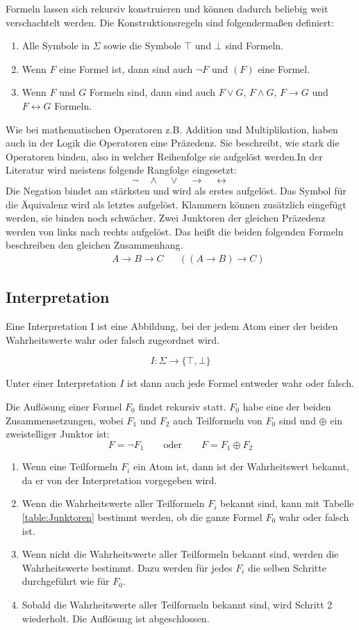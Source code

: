 Formeln lassen sich rekursiv konstruieren und können dadurch beliebig weit verschachtelt werden. Die Konstruktionsregeln sind folgendermaßen definiert:
\begin{enumerate}
	\item Alle Symbole in $\Sigma$ sowie die Symbole $\top$ und $\bot$ sind Formeln.
	\item Wenn $F$ eine Formel ist, dann sind auch $\neg F$ und $(F)$ eine Formel.
	\item Wenn $F$ und $G$ Formeln sind, dann sind auch $F \vee G$, $F \wedge G$, $F \to G$ und $F \leftrightarrow G$ Formeln.
\end{enumerate}
Wie bei mathematischen Operatoren z.B. Addition und Multiplikation, haben auch in der Logik die Operatoren eine Präzedenz. Sie beschreibt, wie stark die Operatoren binden, also in welcher Reihenfolge sie aufgelöst werden.In der Literatur wird meistens folgende Rangfolge eingesetzt:
$$\neg \quad \wedge \quad \vee \quad \to \quad \leftrightarrow$$
Die Negation bindet am stärksten und wird als erstes aufgelöst. Das Symbol für die Äquivalenz wird als letztes aufgelöst. Klammern können zusätzlich eingefügt werden, sie binden noch schwächer.
Zwei Junktoren der gleichen Präzedenz werden von links nach rechts aufgelöst. Das heißt die beiden folgenden Formeln beschreiben den gleichen Zusammenhang.
\begin{align*}
	&& A\to B\to C && ((A\to B)\to C)
\end{align*}
\subsection{Interpretation}

Eine Interpretation I ist eine Abbildung, bei der jedem Atom einer der beiden Wahrheitswerte wahr oder falsch zugeordnet wird. 

$$I: \Sigma\to\{\top,\bot\}$$

Unter einer Interpretation $I$ ist dann auch jede Formel entweder wahr oder falsch.

Die Auflösung einer Formel $F_0$ findet rekursiv statt. $F_0$ habe eine der beiden Zusammensetzungen, wobei $F_1$ und $F_2$ auch Teilformeln von $F_0$ sind und $\oplus$ ein zweistelliger Junktor ist:
$$F=\neg F_1 \quad\quad\text{oder}\quad\quad F=F_1 \oplus F_2$$ 
\begin{enumerate}
	\item Wenn eine Teilformeln $F_i$ ein Atom ist, dann ist der Wahrheitswert bekannt, da er von der Interpretation vorgegeben wird.
	\item Wenn die Wahrheitswerte aller Teilformeln $F_i$ bekannt sind, kann mit Tabelle \ref{table:Junktoren} bestimmt werden, ob die ganze Formel $F_0$ wahr oder falsch ist.
	\item Wenn nicht die Wahrheitswerte aller Teilformeln bekannt sind, werden die Wahrheitswerte bestimmt. Dazu werden für jedes $F_i$ die selben Schritte durchgeführt wie für $F_0$. 
	\item Sobald die Wahrheitswerte aller Teilformeln bekannt sind, wird Schritt 2 wiederholt. Die Auflösung ist abgeschlossen.
\end{enumerate}


